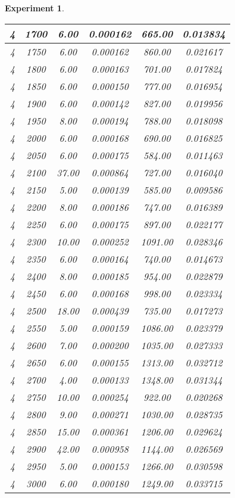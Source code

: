 \documentclass[runningheads,a4paper]{llncs}
\newtheorem{experiment}{Experiment}
\begin{document}
\begin{experiment}
\begin{table}[htpb]
{\begin{tabular}{|c|c|c|c|c|c|}
4 & 1700 & 6.00  & 0.000162 & 665.00  & 0.013834 \\ \hline
4 & 1750 & 6.00  & 0.000162 & 860.00  & 0.021617 \\ \hline
4 & 1800 & 6.00  & 0.000163 & 701.00  & 0.017824 \\ \hline
4 & 1850 & 6.00  & 0.000150 & 777.00  & 0.016954 \\ \hline
4 & 1900 & 6.00  & 0.000142 & 827.00  & 0.019956 \\ \hline
4 & 1950 & 8.00  & 0.000194 & 788.00  & 0.018098 \\ \hline
4 & 2000 & 6.00  & 0.000168 & 690.00  & 0.016825 \\ \hline
4 & 2050 & 6.00  & 0.000175 & 584.00  & 0.011463 \\ \hline
4 & 2100 & 37.00 & 0.000864 & 727.00  & 0.016040 \\ \hline
4 & 2150 & 5.00  & 0.000139 & 585.00  & 0.009586 \\ \hline
4 & 2200 & 8.00  & 0.000186 & 747.00  & 0.016389 \\ \hline
4 & 2250 & 6.00  & 0.000175 & 897.00  & 0.022177 \\ \hline
4 & 2300 & 10.00 & 0.000252 & 1091.00 & 0.028346 \\ \hline
4 & 2350 & 6.00  & 0.000164 & 740.00  & 0.014673 \\ \hline
4 & 2400 & 8.00  & 0.000185 & 954.00  & 0.022879 \\ \hline
4 & 2450 & 6.00  & 0.000168 & 998.00  & 0.023334 \\ \hline
4 & 2500 & 18.00 & 0.000439 & 735.00  & 0.017273 \\ \hline
4 & 2550 & 5.00  & 0.000159 & 1086.00 & 0.023379 \\ \hline
4 & 2600 & 7.00  & 0.000200 & 1035.00 & 0.027333 \\ \hline
4 & 2650 & 6.00  & 0.000155 & 1313.00 & 0.032712 \\ \hline
4 & 2700 & 4.00  & 0.000133 & 1348.00 & 0.031344 \\ \hline
4 & 2750 & 10.00 & 0.000254 & 922.00  & 0.020268 \\ \hline
4 & 2800 & 9.00  & 0.000271 & 1030.00 & 0.028735 \\ \hline
4 & 2850 & 15.00 & 0.000361 & 1206.00 & 0.029624 \\ \hline
4 & 2900 & 42.00 & 0.000958 & 1144.00 & 0.026569 \\ \hline
4 & 2950 & 5.00  & 0.000153 & 1266.00 & 0.030598 \\ \hline
4 & 3000 & 6.00  & 0.000180 & 1249.00 & 0.033715 \\ \hline

\end{tabular}}
\end{table}
\end{experiment}
\end{document}
